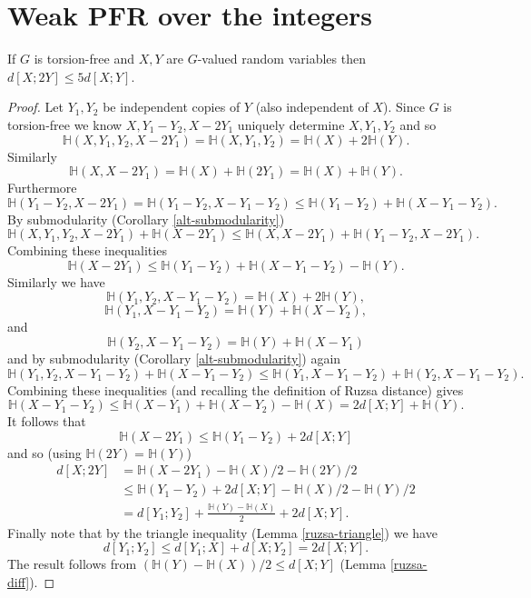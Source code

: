 \chapter{Weak PFR over the integers}

\begin{lemma}\label{torsion-free-doubling}\leanok
If $G$ is torsion-free and $X,Y$ are $G$-valued random variables then $d[X;2Y]\leq 5d[X;Y]$.
\end{lemma}
\begin{proof}
\leanok
Let $Y_1,Y_2$ be independent copies of $Y$ (also independent of $X$). Since $G$ is torsion-free we know $X,Y_1-Y_2,X-2Y_1$ uniquely determine $X,Y_1,Y_2$ and so
\[\mathbb{H}(X,Y_1,Y_2,X-2Y_1)=\mathbb{H}(X,Y_1,Y_2)=\mathbb{H}(X)+2\mathbb{H}(Y).\]
Similarly
\[\mathbb{H}(X,X-2Y_1)=\mathbb{H}(X)+\mathbb{H}(2Y_1)=\mathbb{H}(X)+\mathbb{H}(Y).\]
Furthermore
\[\mathbb{H}(Y_1-Y_2,X-2Y_1)=\mathbb{H}(Y_1-Y_2,X-Y_1-Y_2)\leq \mathbb{H}(Y_1-Y_2)+\mathbb{H}(X-Y_1-Y_2).\]
By submodularity (Corollary \ref{alt-submodularity})
\[\mathbb{H}(X,Y_1,Y_2,X-2Y_1)+\mathbb{H}(X-2Y_1)\leq \mathbb{H}(X,X-2Y_1)+\mathbb{H}(Y_1-Y_2,X-2Y_1).\]
Combining these inequalities
\[\mathbb{H}(X-2Y_1)\leq \mathbb{H}(Y_1-Y_2)+\mathbb{H}(X-Y_1-Y_2)-\mathbb{H}(Y).\]
Similarly we have
\[\mathbb{H}(Y_1,Y_2,X-Y_1-Y_2)=\mathbb{H}(X)+2\mathbb{H}(Y),\]
\[\mathbb{H}(Y_1,X-Y_1-Y_2)=\mathbb{H}(Y)+\mathbb{H}(X-Y_2),\]
and
\[\mathbb{H}(Y_2,X-Y_1-Y_2)=\mathbb{H}(Y)+\mathbb{H}(X-Y_1)\]
and by submodularity (Corollary \ref{alt-submodularity}) again
\[\mathbb{H}(Y_1,Y_2,X-Y_1-Y_2)+ \mathbb{H}(X-Y_1-Y_2)\leq \mathbb{H}(Y_1,X-Y_1-Y_2)+\mathbb{H}(Y_2,X-Y_1-Y_2).\]
Combining these inequalities (and recalling the definition of Ruzsa distance) gives
\[\mathbb{H}(X-Y_1-Y_2)\leq \mathbb{H}(X-Y_1)+\mathbb{H}(X-Y_2)-\mathbb{H}(X)=2d[X;Y]+\mathbb{H}(Y).\]
It follows that
\[\mathbb{H}(X-2Y_1)\leq \mathbb{H}(Y_1-Y_2)+2d[X;Y]\]
and so (using $\mathbb{H}(2Y)=\mathbb{H}(Y)$)
\begin{align*}
d[X;2Y]
&=\mathbb{H}(X-2Y_1)-\mathbb{H}(X)/2-\mathbb{H}(2Y)/2\\
&\leq \mathbb{H}(Y_1-Y_2)+2d[X;Y]-\mathbb{H}(X)/2-\mathbb{H}(Y)/2\\
&= d[Y_1;Y_2]+\frac{\mathbb{H}(Y)-\mathbb{H}(X)}{2}+2d[X;Y].
\end{align*}
Finally note that by the triangle inequality (Lemma \ref{ruzsa-triangle}) we have
\[d[Y_1;Y_2]\leq d[Y_1;X]+d[X;Y_2]=2d[X;Y].\]
The result follows from $(\mathbb{H}(Y)-\mathbb{H}(X))/2\leq d[X;Y]$ (Lemma \ref{ruzsa-diff}).
\end{proof}

